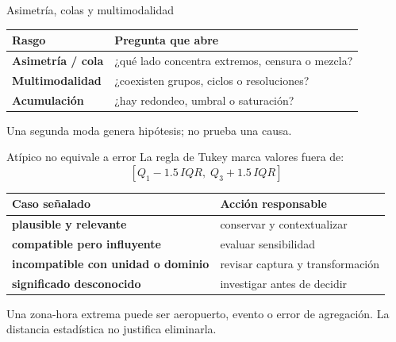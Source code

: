 \documentclass[aspectratio=169,11pt]{beamer}
\begin{document}
\begin{frame}{Asimetría, colas y multimodalidad}
  \footnotesize
  \centering
  \vspace{.7em}
  \begin{tabularx}{\textwidth}{>{\bfseries}p{} X}
    \toprule
    Rasgo & Pregunta que abre \\
    \midrule
    Asimetría / cola & ¿qué lado concentra extremos, censura o mezcla? \\
    Multimodalidad & ¿coexisten grupos, ciclos o resoluciones? \\
    Acumulación & ¿hay redondeo, umbral o saturación? \\
    \bottomrule
  \end{tabularx}
  \par Una segunda moda genera hipótesis; no prueba una causa.
\end{frame}

\begin{frame}{Atípico no equivale a error}
  \small
  La regla de Tukey marca valores fuera de:
  \[
    [Q_1-1.5\,IQR,\;Q_3+1.5\,IQR]
  \]
  \begin{tabularx}{\textwidth}{>{\bfseries}p{} X}
    \toprule
    Caso señalado & Acción responsable \\
    \midrule
    plausible y relevante & conservar y contextualizar \\
    compatible pero influyente & evaluar sensibilidad \\
    incompatible con unidad o dominio & revisar captura y transformación \\
    significado desconocido & investigar antes de decidir \\
    \bottomrule
  \end{tabularx}
  \vfill
  \centering Una zona-hora extrema puede ser aeropuerto, evento o error de agregación. La distancia estadística no justifica eliminarla.
\end{frame}
\end{document}
